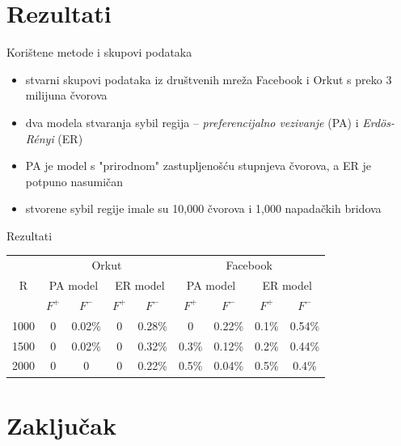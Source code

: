 \documentclass{beamer}
\begin{document}
\section{Rezultati}

\begin{frame}{Korištene metode i skupovi podataka}
  \begin{itemize}
    \item stvarni skupovi podataka iz društvenih mreža Facebook i Orkut s preko 3 milijuna čvorova
    \item dva modela stvaranja sybil regija -- \textit{preferencijalno vezivanje} (PA) i \textit{Erdös-Rényi} (ER)
    \item PA je model s "prirodnom" zastupljenošću stupnjeva čvorova, a ER je potpuno nasumičan
    \item stvorene sybil regije imale su 10,000 čvorova i 1,000 napadačkih bridova
  \end{itemize}
\end{frame}

\begin{frame}{Rezultati}
  \begin{table}
    \centering
    \begin{tabular}{|c|c|c|c|c|c|c|c|c|} \hline
      \multirow{3}{*}{R} & \multicolumn{4}{c|}{Orkut} & \multicolumn{4}{c|}{Facebook} \\
      & \multicolumn{2}{c}{PA model} & \multicolumn{2}{c|}{ER model} & \multicolumn{2}{c}{PA model} & \multicolumn{2}{c|}{ER model} \\
      & \multicolumn{1}{c}{$F^+$} & \multicolumn{1}{c}{$F^-$} & \multicolumn{1}{c}{$F^+$} & \multicolumn{1}{c|}{$F^-$} & \multicolumn{1}{c}{$F^+$} & \multicolumn{1}{c}{$F^-$} & \multicolumn{1}{c}{$F^+$} & \multicolumn{1}{c|}{$F^-$} \\ \hline
      1000 & 0 & 0.02\% & 0 & 0.28\% & 0 & 0.22\% & 0.1\% & 0.54\% \\
      1500 & 0 & 0.02\% & 0 & 0.32\% & 0.3\% & 0.12\% & 0.2\% & 0.44\% \\
      2000 & 0 & 0 & 0 & 0.22\% & 0.5\% & 0.04\% & 0.5\% & 0.4\% \\
      \hline
    \end{tabular}
  \end{table}
\end{frame}

\section{Zaključak}
\end{document}
